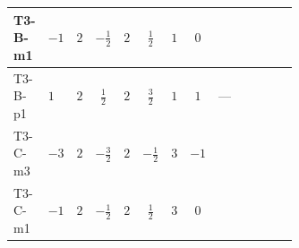 \documentclass[8pt]{article}
\begin{document}
\begin{landscape}
\begin{longtable}{@{}llcccccc >{\raggedright\arraybackslash}p{0.21\linewidth} >{\raggedright\arraybackslash}p{0.21\linewidth} >{\raggedright\arraybackslash}p{0.21\linewidth}@{}}
\midrule
T3-B-m1 & $-1$ & $2$ & $-\frac{1}{2}$ & $2$ & $\frac{1}{2}$ & $1$ & $0$ & \scriptsize\adjustbox{max width=\linewidth}{$\begin{gathered} +{g_1}^2 \left(-6 {g_2}^2-3 {\lambda_{HS_1}^{(A)}}\right)\end{gathered}$} & \scriptsize\adjustbox{max width=\linewidth}{$\begin{gathered} -9 {g_2}^2 {\lambda_{HS_1}^{(A)}}\end{gathered}$} & \scriptsize\adjustbox{max width=\linewidth}{$\begin{gathered} +{\lambda_{12}^{(A)}} {\lambda_{HS_2}^{(A)}}\end{gathered}$} \\
\midrule
T3-B-p1 & $1$ & $2$ & $\frac{1}{2}$ & $2$ & $\frac{3}{2}$ & $1$ & $1$ & --- & \scriptsize\adjustbox{max width=\linewidth}{$\begin{gathered} -9 {g_2}^2 {\lambda_{HS_1}^{(A)}}\end{gathered}$} & \scriptsize\adjustbox{max width=\linewidth}{$\begin{gathered} +{\lambda_{12}^{(A)}} {\lambda_{HS_2}^{(A)}}\end{gathered}$} \\
\midrule
T3-C-m3 & $-3$ & $2$ & $-\frac{3}{2}$ & $2$ & $-\frac{1}{2}$ & $3$ & $-1$ & \scriptsize\adjustbox{max width=\linewidth}{$\begin{gathered} +{g_1}^2 \left(-18 {g_2}^2-15 {\lambda_{HS_1}^{(A)}}\right)\end{gathered}$} & \scriptsize\adjustbox{max width=\linewidth}{$\begin{gathered} -9 {g_2}^2 {\lambda_{HS_1}^{(A)}}\end{gathered}$} & \scriptsize\adjustbox{max width=\linewidth}{$\begin{gathered} +{\lambda_{12}^{(A)}} {\lambda_{HS_2}^{(A)}}\end{gathered}$} \\
\midrule
T3-C-m1 & $-1$ & $2$ & $-\frac{1}{2}$ & $2$ & $\frac{1}{2}$ & $3$ & $0$ & \scriptsize\adjustbox{max width=\linewidth}{$\begin{gathered} +{g_1}^2 \left(-6 {g_2}^2-3 {\lambda_{HS_1}^{(A)}}\right)\end{gathered}$} & \scriptsize\adjustbox{max width=\linewidth}{$\begin{gathered} -9 {g_2}^2 {\lambda_{HS_1}^{(A)}}\end{gathered}$} & \scriptsize\adjustbox{max width=\linewidth}{$\begin{gathered} +{\lambda_{12}^{(A)}} {\lambda_{HS_2}^{(A)}}\end{gathered}$} \\

\end{longtable}
\end{landscape}
\end{document}
